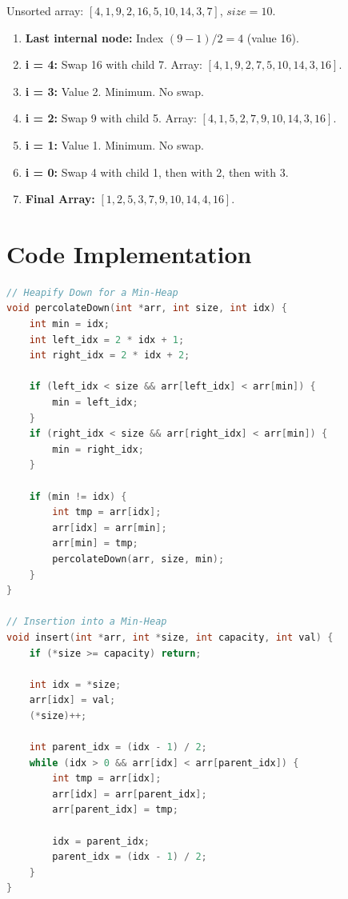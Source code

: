 \begin{example}
Unsorted array: $[4, 1, 9, 2, 16, 5, 10, 14, 3, 7]$, $size = 10$.
\begin{enumerate}
    \item \textbf{Last internal node:} Index $(9-1)/2 = 4$ (value 16).
    \item \textbf{i = 4:} Swap 16 with child 7. Array: $[4, 1, 9, 2, 7, 5, 10, 14, 3, 16]$.
    \item \textbf{i = 3:} Value 2. Minimum. No swap.
    \item \textbf{i = 2:} Swap 9 with child 5. Array: $[4, 1, 5, 2, 7, 9, 10, 14, 3, 16]$.
    \item \textbf{i = 1:} Value 1. Minimum. No swap.
    \item \textbf{i = 0:} Swap 4 with child 1, then with 2, then with 3.
    \item \textbf{Final Array:} $[1, 2, 5, 3, 7, 9, 10, 14, 4, 16]$.
\end{enumerate}
\end{example}

\section{Code Implementation}

\begin{lstlisting}[language=C]
// Heapify Down for a Min-Heap
void percolateDown(int *arr, int size, int idx) {
    int min = idx;
    int left_idx = 2 * idx + 1;
    int right_idx = 2 * idx + 2;

    if (left_idx < size && arr[left_idx] < arr[min]) {
        min = left_idx;
    }
    if (right_idx < size && arr[right_idx] < arr[min]) {
        min = right_idx;
    }

    if (min != idx) {
        int tmp = arr[idx];
        arr[idx] = arr[min];
        arr[min] = tmp;
        percolateDown(arr, size, min);
    }
}

// Insertion into a Min-Heap
void insert(int *arr, int *size, int capacity, int val) {
    if (*size >= capacity) return; 
    
    int idx = *size;
    arr[idx] = val;
    (*size)++;
    
    int parent_idx = (idx - 1) / 2;
    while (idx > 0 && arr[idx] < arr[parent_idx]) {
        int tmp = arr[idx];
        arr[idx] = arr[parent_idx];
        arr[parent_idx] = tmp;
        
        idx = parent_idx;
        parent_idx = (idx - 1) / 2;
    }
}
\end{lstlisting}

